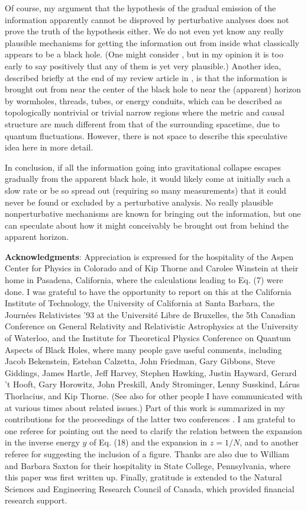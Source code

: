\documentclass[12pt]{article}
\begin{document}
	Of course, my argument that the hypothesis of the gradual
emission of the information apparently cannot be disproved by
perturbative analyses does not prove the truth of the hypothesis
either.  We do not even yet know any really plausible
mechanisms for getting the information out from inside what
classically appears to be a black hole.  (One might consider
\cite{Hoo,BekSch,uni2DBH,STU}, but in my opinion it is too early
to say positively that any of them is yet very plausible.)
Another idea, described briefly at the end of my review article
in \cite{Pag93}, is that the information is brought out from near
the center of the black hole to near the (apparent) horizon by
wormholes, threads, tubes, or energy conduits, which can
be described as topologically nontrivial or trivial narrow regions
where the metric and causal structure are much different from
that of the surrounding spacetime, due to quantum fluctuations.
However, there is not space to describe this speculative idea
here in more detail.

	In conclusion, if all the information going into
gravitational
collapse escapes gradually from the apparent black hole, it
would likely come at initially such a slow rate or
be so spread out (requiring so many measurements)
that it could never be found or excluded by a perturbative analysis.
No really plausible nonperturbative mechanisms are known for
bringing out the information, but one can speculate about how it
might conceivably be brought out from behind the apparent horizon.

\newpage
	{\bf Acknowledgments}:  Appreciation is expressed for
the hospitality of the Aspen Center for Physics in Colorado
and of Kip Thorne and Carolee Winstein at their home in Pasadena,
California, where the calculations leading to Eq. (7) were done.
I was grateful to have the opportunity to report on this at
the California Institute of Technology, the
University of California at Santa Barbara, the Journ\'{e}es
Relativistes
'93 at the Universit\'{e} Libre de Bruxelles, the 5th Canadian
Conference on General Relativity and Relativistic Astrophysics
at the University of Waterloo, and the Institute for Theoretical
Physics Conference on Quantum Aspects of Black Holes,
where many people gave useful comments,
including Jacob Bekenstein, Esteban Calzetta,
John Friedman, Gary Gibbons, Steve Giddings, James Hartle,
Jeff Harvey, Stephen Hawking, Justin Hayward, Gerard 't Hooft,
Gary Horowitz, John Preskill, Andy Strominger, Lenny Susskind,
L\'{a}rus Thorlacius, and Kip Thorne.  (See also \cite{Pag93} for
other
people I have communicated with at various times about related
issues.)
Part of this work is summarized in my contributions
for the proceedings of the latter two conferences \cite{Brux,Pag93}.
I am grateful to one referee for pointing out the need
to clarify the relation between the expansion in the
inverse energy $y$ of Eq. (18) and the expansion in
$z=1/N$, and to another referee for suggesting
the inclusion of a figure.
Thanks are also due to William and Barbara Saxton
for their hospitality in State College, Pennsylvania,
where this paper was first written up.
Finally, gratitude is extended to the
Natural Sciences and Engineering Research Council of
Canada, which provided financial research support.
\end{document}
